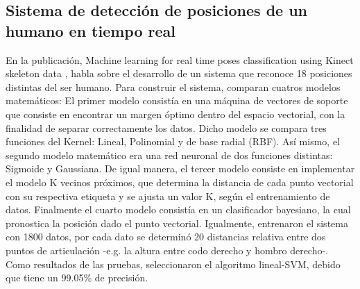 \subsection{Sistema de detecci\'on de posiciones de un humano en tiempo real} \label{tr:8} 
En la publicaci\'on, Machine learning for real time poses classification using Kinect skeleton data \cite{choubik2016machine}, habla sobre el desarrollo de un sistema que reconoce 18 posiciones distintas del ser humano.
\medbreak 
Para construir el sistema,   comparan cuatros modelos matem\'aticos: El primer modelo consist\'ia en una m\'aquina de vectores de soporte que consiste en encontrar un margen \'optimo dentro del espacio vectorial, con la finalidad de separar correctamente los datos. Dicho modelo se compara tres funciones del Kernel: Lineal, Polinomial y de base radial (RBF). As\'i mismo, el segundo modelo matem\'atico era una red neuronal de dos funciones distintas: Sigmoide y Gaussiana. De igual manera, el tercer modelo consiste en implementar el modelo K vecinos pr\'oximos, que determina la distancia de cada punto vectorial con su respectiva etiqueta y se ajusta un valor K, seg\'un el entrenamiento de datos. Finalmente el cuarto modelo consist\'ia en un clasificador bayesiano, la cual pronostica la posici\'on dado el punto vectorial.
\medbreak 
Igualmente,  entrenaron el sistema con 1800 datos, por cada dato se determin\'o  20 distancias relativa entre dos puntos de articulaci\'on -e.g. la altura entre codo derecho y hombro derecho-.
\medbreak 
Como resultados de las pruebas,   seleccionaron el algoritmo lineal-SVM, debido que tiene un 99.05\% de precisi\'on.
